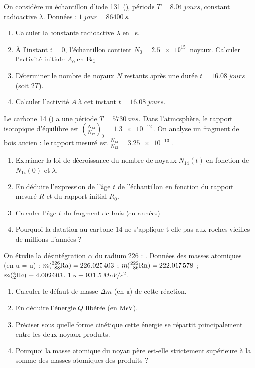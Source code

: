 \documentclass[11pt]{article}
\begin{document}
\begin{exercice}
On considère un échantillon d'iode 131 (), période $T = \SI{8,04}{jours}$, constant radioactive $\lambda$.
Données : $\SI{1}{jour} = \SI{86400}{s}$.
\begin{enumerate}
    \item Calculer la constante radioactive $\lambda$ en \si{\per\second}.
    \item À l'instant $t=0$, l'échantillon contient $N_0 = \SI{2,5e15}{}$ noyaux. Calculer l'activité initiale $A_0$ en \si{\becquerel}.
    \item Déterminer le nombre de noyaux $N$ restants après une durée $t = \SI{16,08}{jours}$ (soit $2T$).
    \item Calculer l'activité $A$ à cet instant $t = \SI{16,08}{jours}$.
\end{enumerate}
\end{exercice}

\begin{exercice}
Le carbone 14 () a une période $T = \SI{5730}{ans}$. Dans l'atmosphère, le rapport isotopique d'équilibre est $\left(\frac{N_{14}}{N_{12}}\right)_0 = \SI{1,3e-12}{}$.
On analyse un fragment de bois ancien : le rapport mesuré est $\frac{N_{14}}{N_{12}} = \SI{3,25e-13}{}$.
\begin{enumerate}
    \item Exprimer la loi de décroissance du nombre de noyaux $N_{14}(t)$ en fonction de $N_{14}(0)$ et $\lambda$.
    \item En déduire l'expression de l'âge $t$ de l'échantillon en fonction du rapport mesuré $R$ et du rapport initial $R_0$.
    \item Calculer l'âge $t$ du fragment de bois (en années).
    \item Pourquoi la datation au carbone 14 ne s'applique-t-elle pas aux roches vieilles de millions d'années ?
\end{enumerate}
\end{exercice}

\begin{exercice}
On étudie la désintégration $\alpha$ du radium 226 : .
Données des masses atomiques (en \si{\atomicmassunit} = \si{u}) :
$m(\ce{^{226}_{88}Ra}) = \num{226,025403}$ ; $m(\ce{^{222}_{86}Rn}) = \num{222,017578}$ ; $m(\ce{^{4}_{2}He}) = \num{4,002603}$.
$1~\si{u} = \SI{931,5}{MeV/c^2}$.
\begin{enumerate}
    \item Calculer le défaut de masse $\Delta m$ (en \si{u}) de cette réaction.
    \item En déduire l'énergie $Q$ libérée (en \si{MeV}).
    \item Préciser sous quelle forme cinétique cette énergie se répartit principalement entre les deux noyaux produits.
    \item Pourquoi la masse atomique du noyau père est-elle strictement supérieure à la somme des masses atomiques des produits ?
\end{enumerate}
\end{exercice}
\end{document}

